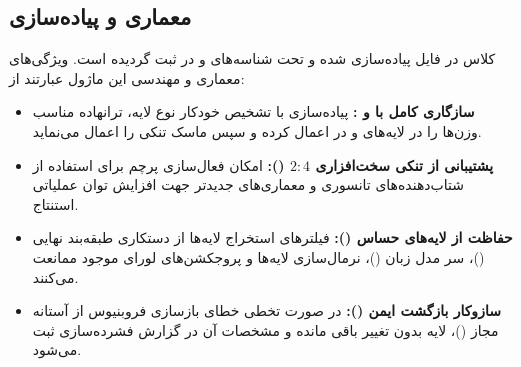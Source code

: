 \subsection{معماری و پیاده‌سازی}
کلاس  در فایل  پیاده‌سازی شده و تحت شناسه‌های  و  در  ثبت گردیده است. ویژگی‌های معماری و مهندسی این ماژول عبارتند از:
\begin{itemize}
    \item \textbf{سازگاری کامل با  و :} پیاده‌سازی با تشخیص خودکار نوع لایه، ترانهاده مناسب وزن‌ها را در لایه‌های  و  در  اعمال کرده و سپس ماسک تنکی را اعمال می‌نماید.
    \item \textbf{پشتیبانی از تنکی سخت‌افزاری $2:4$ ():} امکان فعال‌سازی پرچم  برای استفاده از شتاب‌دهنده‌های تانسوری  و معماری‌های جدیدتر جهت افزایش توان عملیاتی استنتاج.
    \item \textbf{حفاظت از لایه‌های حساس ():} فیلترهای استخراج لایه‌ها از دستکاری طبقه‌بند نهایی ()، سر مدل زبان ()، نرمال‌سازی لایه‌ها و پروجکشن‌های لورای موجود ممانعت می‌کنند.
    \item \textbf{سازوکار بازگشت ایمن ():} در صورت تخطی خطای بازسازی فروبنیوس از آستانه مجاز ()، لایه بدون تغییر باقی مانده و مشخصات آن در گزارش فشرده‌سازی ثبت می‌شود.
\end{itemize}
